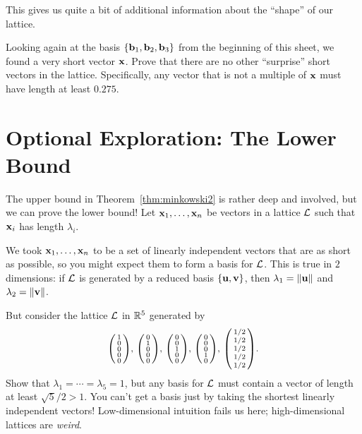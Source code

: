 This gives us quite a bit of additional information about the ``shape'' of our lattice.

\begin{explor}
	Looking again at the basis $\{\mathbf{b}_1,\mathbf{b}_2,\mathbf{b}_3\}$ from the beginning of this sheet, we found a very short vector $\mathbf{x}$. Prove that there are no other ``surprise'' short vectors in the lattice. Specifically, any vector that is not a multiple of $\mathbf{x}$ must have length at least $0.275$.
\end{explor}


\section*{Optional Exploration: The Lower Bound}
The upper bound in Theorem~\ref{thm:minkowski2} is rather deep and involved, but we can prove the lower bound! Let $\mathbf{x}_1,\ldots,\mathbf{x}_n$ be vectors in a lattice $\mathcal{L}$ such that $\mathbf{x}_i$ has length $\lambda_i$.


\begin{explor}
	We took $\mathbf{x}_1,\ldots,\mathbf{x}_n$ to be a set of linearly independent vectors that are as short as possible, so you might expect them to form a basis for $\mathcal{L}$. This is true in $2$ dimensions: if $\mathcal{L}$ is generated by a reduced basis $\{\mathbf{u},\mathbf{v}\}$, then $\lambda_1=\|\mathbf{u}\|$ and $\lambda_2=\|\mathbf{v}\|$. 
	
	But consider the lattice $\mathcal{L}$ in $\mathbb{R}^5$ generated by
	\[\begin{psmallmatrix}
	1\\0\\0\\0\\0
	\end{psmallmatrix},\,\begin{psmallmatrix}
	0\\1\\0\\0\\0
	\end{psmallmatrix},\,\begin{psmallmatrix}
	0\\0\\1\\0\\0
	\end{psmallmatrix},\,\begin{psmallmatrix}
	0\\0\\0\\1\\0
	\end{psmallmatrix},\,\begin{psmallmatrix}
	1/2\\1/2\\1/2\\1/2\\1/2
	\end{psmallmatrix}.\]
	Show that $\lambda_1=\cdots=\lambda_5=1$, but any basis for $\mathcal{L}$ must contain a vector of length at least $\sqrt{5}/2>1$. You can't get a basis just by taking the shortest linearly independent vectors! Low-dimensional intuition fails us here; high-dimensional lattices are \emph{weird}.
\end{explor}

